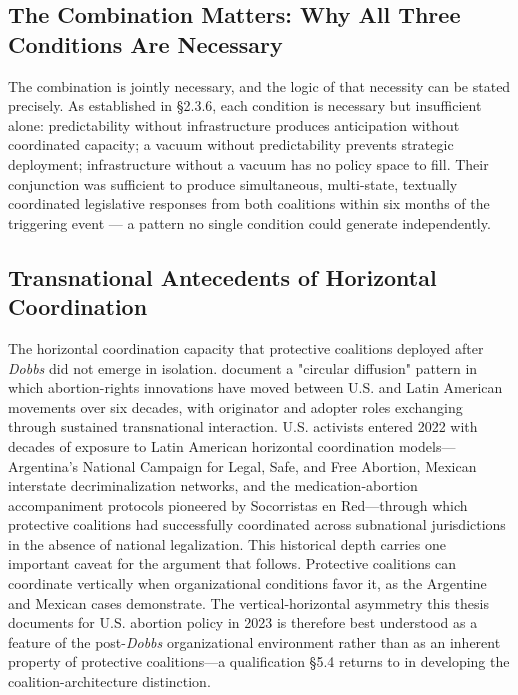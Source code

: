 \subsection{The Combination Matters: Why All Three Conditions Are Necessary}

The combination is jointly necessary, and the logic of that necessity can be stated precisely. As established in §2.3.6, each condition is necessary but insufficient alone: predictability without infrastructure produces anticipation without coordinated capacity; a vacuum without predictability prevents strategic deployment; infrastructure without a vacuum has no policy space to fill. Their conjunction was sufficient to produce simultaneous, multi-state, textually coordinated legislative responses from both coalitions within six months of the triggering event — a pattern no single condition could generate independently.

\subsection{Transnational Antecedents of Horizontal Coordination}

The horizontal coordination capacity that protective coalitions deployed after \textit{Dobbs} did not emerge in isolation. \textcite{fernandezandersonDiffusingStrategiesNorthSouth2025} document a "circular diffusion" pattern in which abortion-rights innovations have moved between U.S. and Latin American movements over six decades, with originator and adopter roles exchanging through sustained transnational interaction. U.S. activists entered 2022 with decades of exposure to Latin American horizontal coordination models---Argentina's National Campaign for Legal, Safe, and Free Abortion, Mexican interstate decriminalization networks, and the medication-abortion accompaniment protocols pioneered by Socorristas en Red---through which protective coalitions had successfully coordinated across subnational jurisdictions in the absence of national legalization. This historical depth carries one important caveat for the argument that follows. Protective coalitions can coordinate vertically when organizational conditions favor it, as the Argentine and Mexican cases demonstrate. The vertical-horizontal asymmetry this thesis documents for U.S. abortion policy in 2023 is therefore best understood as a feature of the post-\textit{Dobbs} organizational environment rather than as an inherent property of protective coalitions---a qualification §5.4 returns to in developing the coalition-architecture distinction.

